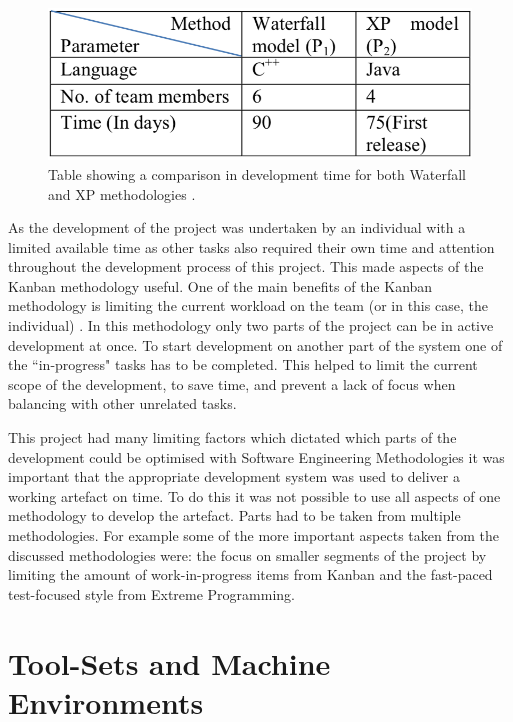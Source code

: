 \documentclass[11pt,a4paper]{report}
\begin{document}
\begin{figure}
 \centering
 \includegraphics[scale = 0.45]{XP_vs_Waterfall.png}
 \caption[Waterfall VS XP]{Table showing a comparison in development time for both Waterfall and XP 		methodologies \citep{XPsharma2016analysis}.}
 \label{fig:XPvsWater}
\end{figure}

As the development of the project was undertaken by an individual with a limited available time as other tasks also required their own time and attention throughout the development process of this project. This made aspects of the Kanban methodology useful. One of the main benefits of the Kanban methodology is limiting the current workload on the team (or in this case, the individual) \citep{Kanban_lei2017statistical}. In this methodology only two parts of the project can be in active development at once. To start development on another part of the system one of the ``in-progress" tasks has to be completed. This helped to limit the current scope of the development, to save time, and prevent a lack of focus when balancing with other unrelated tasks.

This project had many limiting factors which dictated which parts of the development could be optimised with Software Engineering Methodologies it was important that the appropriate development system was used to deliver a working artefact on time. To do this it was not possible to use all aspects of one methodology to develop the artefact. Parts had to be taken from multiple methodologies. For example some of the more important aspects taken from the discussed methodologies were: the focus on smaller segments of the project by limiting the amount of work-in-progress items from Kanban and the fast-paced test-focused style from Extreme Programming.

\section{Tool-Sets and Machine Environments}
\end{document}
